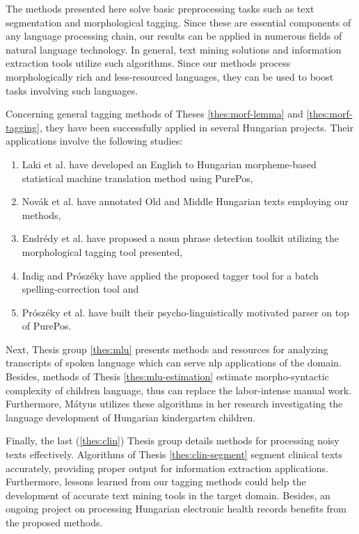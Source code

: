
The methods presented here solve basic preprocessing tasks such as text segmentation and morphological tagging. 
Since these are essential components of any language processing chain, our results can be applied in numerous fields of natural language technology. 
In general, text mining solutions and information extraction tools utilize such algorithms.
Since our methods process morphologically rich and less-resourced languages, they can be used to boost tasks involving such languages.

Concerning general tagging methods of Theses \ref{thes:morf-lemma} and \ref{thes:morf-tagging}, they have been successfully applied in several Hungarian projects.
Their applications involve the following studies:
\begin{enumerate}
\item Laki et al. \cite{Laki2013} have developed an English to Hungarian morpheme-based statistical machine translation method using PurePos,
\item Novák et al. \cite{Novak2013} have annotated Old and Middle Hungarian texts employing our methods,
\item Endrédy et al. \cite{Endredy2014} have proposed a noun phrase detection toolkit utilizing the morphological tagging tool presented,
\item Indig and Prószéky have applied \cite{Indig2013} the proposed tagger tool for a batch spelling-correction tool and
\item Prószéky et al. \cite{Proszeky2014} have built their psycho-linguistically motivated parser on top of PurePos.
\end{enumerate}

Next, Thesis group \ref{thes:mlu} presents methods and resources for analyzing transcripts of spoken language which can serve \acrshort{nlp} applications of the domain.
Besides, methods of Thesis \ref{thes:mlu-estimation} estimate morpho-syntactic complexity of children language, thus can replace the labor-intense manual work.
Furthermore, Mátyus utilizes \cite{Matyus2014b} these algorithms in her research investigating the language development of Hungarian kindergarten children.

Finally, the last (\ref{thes:clin}) Thesis group details methods for processing noisy texts effectively.
Algorithms of Thesis \ref{thes:clin-segment} segment clinical texts accurately, providing proper output for information extraction applications. 
Furthermore, lessons learned from our tagging methods could help the development of accurate text mining tools in the target domain.
Besides, an ongoing project \cite{Siklosi2014,Siklosi2014mszny,Orosz2014x} on processing Hungarian electronic health records benefits from the proposed methods.


